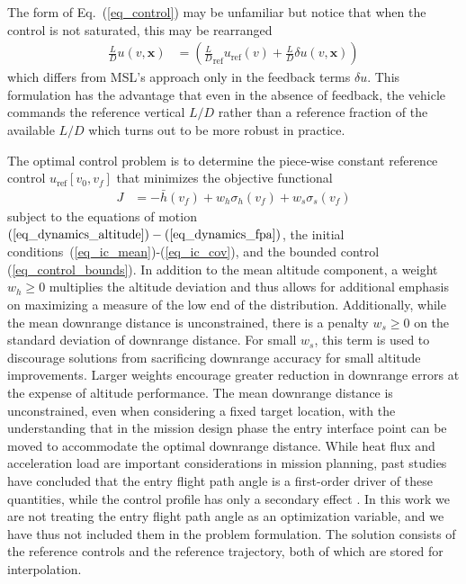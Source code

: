 \documentclass[journal ]{new-aiaa}
\newcommand{\state}{\ensuremath{\mathbf{x}}}
\newcommand{\ur}{\ensuremath{u_{\mathrm{ref}}}}
\newcommand{\E}[1]{\mathbb{E}\left[#1\right]}
\newcommand{\V}[1]{\mathbb{V}[#1]}
\begin{document}
The form of Eq.~(\ref{eq_control}) may be unfamiliar but notice that when the control is not saturated, this may be rearranged 
\begin{align}
	\frac{L}{D}u(v,\state) &= \left(\frac{L}{D}_{\mathrm{ref}}\ur(v) + \frac{L}{D}\delta u(v,\state)\right) 
\end{align}
which differs from MSL's approach only in the feedback terms $\delta u$. This formulation has the advantage that even in the absence of feedback, the vehicle commands the reference vertical $ L/D $ rather than a reference fraction of the available $  L/D $ which turns out to be more robust in practice.

The optimal control problem is to determine the piece-wise constant reference control $\ur\left[v_0,v_f\right]$ that minimizes the objective functional
\begin{align}
J &= -\bar{h}(v_f) + w_h\sigma_h(v_f) + w_s\sigma_s(v_f) \label{eq_objective}
\end{align}
subject to the equations of motion $(\ref{eq_dynamics_altitude})-(\ref{eq_dynamics_fpa})$, the initial conditions~(\ref{eq_ic_mean})-(\ref{eq_ic_cov}), and the bounded control (\ref{eq_control_bounds}). 
In addition to the mean altitude component, a weight $w_h\ge0$ multiplies the altitude deviation and thus allows for additional emphasis on maximizing a measure of the low end of the distribution. Additionally, while the mean downrange distance is unconstrained, there is a penalty $w_s\ge0$ on the standard deviation of downrange distance. For small $w_s$, this term is used to discourage solutions from sacrificing downrange accuracy for small altitude improvements. Larger weights encourage greater reduction in downrange errors at the expense of altitude performance. The mean downrange distance is unconstrained, even when considering a fixed target location, with the understanding that in the mission design phase the entry interface point can be moved to accommodate the optimal downrange distance. While heat flux and acceleration load are important considerations in mission planning, past studies have concluded that the entry flight path angle is a first-order driver of these quantities, while the control profile has only a secondary effect \cite{MSL_EDL2}. In this work we are not treating the entry flight path angle as an optimization variable, and we have thus not included them in the problem formulation. 
The solution consists of the reference controls and the reference trajectory, both of which are stored for interpolation.
\end{document}
